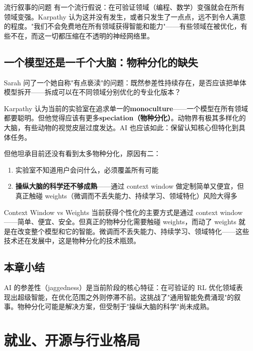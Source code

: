\documentclass[a4paper]{article}
\begin{document}
\begin{warningbox}{流行叙事的问题}
有一个流行假说：在可验证领域（编程、数学）变强就会在所有领域变强。Karpathy 认为这并没有发生，或者只发生了一点点，远不到令人满意的程度。"我们不会免费地在所有领域获得智能和能力"——有些领域在被优化，有些不在，而这一切都压缩在不透明的神经网络里。
\end{warningbox}

\subsection{一个模型还是一千个大脑：物种分化的缺失}

Sarah 问了一个她自称"有点亵渎"的问题：既然参差性持续存在，是否应该把单体模型拆开——拆成可以在不同领域分别优化的专业化版本？

Karpathy 认为当前的实验室在追求单一的\textbf{monoculture}——一个模型在所有领域都要聪明。但他觉得应该有更多\textbf{speciation（物种分化）}。动物界有极其多样化的大脑，有些动物的视觉皮层过度发达。AI 也应该如此：保留认知核心但特化到具体任务。

但他坦承目前还没有看到太多物种分化，原因有二：
\begin{enumerate}
    \item 实验室不知道用户会问什么，必须覆盖所有可能
    \item \textbf{操纵大脑的科学还不够成熟}——通过 context window 做定制简单又便宜，但真正触碰 weights（微调而不丢失能力、持续学习、领域特化）风险大得多
\end{enumerate}

\begin{importantbox}{Context Window vs Weights}
当前获得个性化的主要方式是通过 context window——简单、便宜、安全。但真正的物种分化需要触碰 weights，而动了 weights 就是在改变整个模型和它的智能。微调而不丢失能力、持续学习、领域特化——这些技术还在发展中，这是物种分化的技术瓶颈。
\end{importantbox}

\subsection{本章小结}

AI 的参差性（jaggedness）是当前阶段的核心特征：在可验证的 RL 优化领域表现出超级智能，在优化范围之外则停滞不前。这挑战了"通用智能免费涌现"的叙事。物种分化可能是解决方案，但受制于"操纵大脑的科学"尚未成熟。


\section{就业、开源与行业格局}
\end{document}
